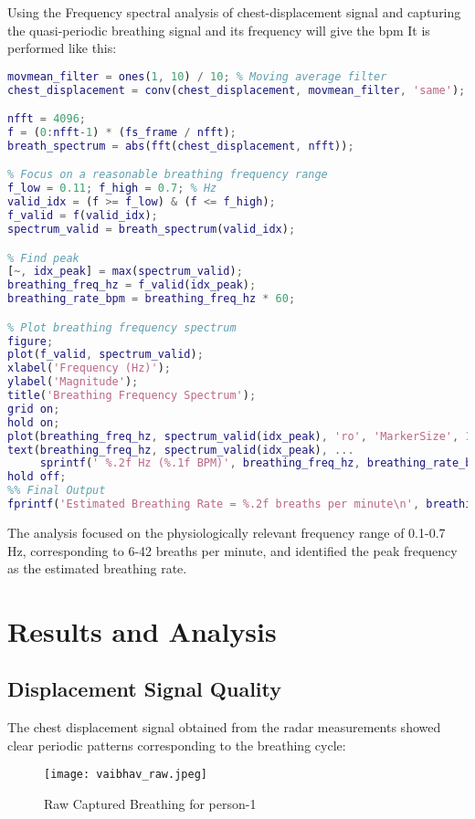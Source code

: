 \documentclass[12pt]{article}
\begin{document}
Using the Frequency spectral analysis of chest-displacement signal and capturing the quasi-periodic breathing signal and its frequency will give the bpm It is performed like this:

\begin{lstlisting}[language=Matlab]
%% Step 6: FFT for breathing rate estimation
movmean_filter = ones(1, 10) / 10; % Moving average filter
chest_displacement = conv(chest_displacement, movmean_filter, 'same');

nfft = 4096;
f = (0:nfft-1) * (fs_frame / nfft);
breath_spectrum = abs(fft(chest_displacement, nfft));

% Focus on a reasonable breathing frequency range
f_low = 0.11; f_high = 0.7; % Hz
valid_idx = (f >= f_low) & (f <= f_high);
f_valid = f(valid_idx);
spectrum_valid = breath_spectrum(valid_idx);

% Find peak
[~, idx_peak] = max(spectrum_valid);
breathing_freq_hz = f_valid(idx_peak);
breathing_rate_bpm = breathing_freq_hz * 60;

% Plot breathing frequency spectrum
figure;
plot(f_valid, spectrum_valid);
xlabel('Frequency (Hz)');
ylabel('Magnitude');
title('Breathing Frequency Spectrum');
grid on;
hold on;
plot(breathing_freq_hz, spectrum_valid(idx_peak), 'ro', 'MarkerSize', 10);
text(breathing_freq_hz, spectrum_valid(idx_peak), ...
     sprintf(' %.2f Hz (%.1f BPM)', breathing_freq_hz, breathing_rate_bpm));
hold off;
%% Final Output
fprintf('Estimated Breathing Rate = %.2f breaths per minute\n', breathing_rate_bpm);
\end{lstlisting}

The analysis focused on the physiologically relevant frequency range of 0.1-0.7 Hz, corresponding to 6-42 breaths per minute, and identified the peak frequency as the estimated breathing rate.

\section{Results and Analysis}

\subsection{Displacement Signal Quality}
The chest displacement signal obtained from the radar measurements showed clear periodic patterns corresponding to the breathing cycle:

\begin{figure}[H]
\centering
\texttt{[image: vaibhav\_raw.jpeg]} %
\caption{Raw Captured Breathing for person-1 }
\end{figure}
\end{document}
